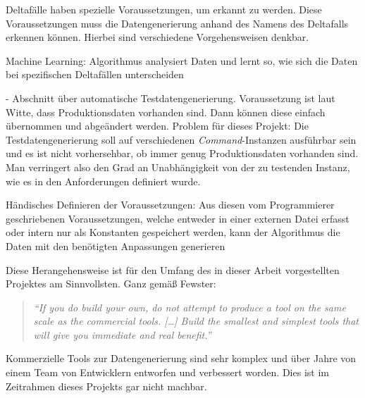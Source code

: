 Deltafälle haben spezielle Voraussetzungen, um erkannt zu werden. Diese Voraussetzungen muss die Datengenerierung anhand des Namens des Deltafalls erkennen können. Hierbei sind verschiedene Vorgehensweisen denkbar. 

Machine Learning: Algorithmus analysiert Daten und lernt so, wie sich die Daten bei spezifischen Deltafällen unterscheiden

\cite[S. 240]{witte:2019} - Abschnitt über automatische Testdatengenerierung. Voraussetzung ist laut Witte, dass Produktionsdaten vorhanden sind. Dann können diese einfach übernommen und abgeändert werden. Problem für dieses Projekt: Die Testdatengenerierung soll auf verschiedenen \textit{Command}-Instanzen ausführbar sein und es ist nicht vorhersehbar, ob immer genug Produktionsdaten vorhanden sind. Man verringert also den Grad an Unabhängigkeit von der zu testenden Instanz, wie es in den Anforderungen definiert wurde.

Händisches Definieren der Voraussetzungen: Aus diesen vom Programmierer geschriebenen Voraussetzungen, welche entweder in einer externen Datei erfasst oder intern nur als Konstanten gespeichert werden, kann der Algorithmus die Daten mit den benötigten Anpassungen generieren

Diese Herangehensweise ist für den Umfang des in dieser Arbeit vorgestellten Projektes am Sinnvollsten. Ganz gemäß Fewster:

\begin{quote}
    \textit{\enquote{If you do build your own, do not attempt to produce a tool on the same scale as the commercial tools. [\dots] Build the smallest and simplest tools that will give you immediate and real benefit.} \cite{fewster:1999}}
\end{quote}

Kommerzielle Tools zur Datengenerierung sind sehr komplex und über Jahre von einem Team von Entwicklern entworfen und verbessert worden. Dies ist im Zeitrahmen dieses Projekts gar nicht machbar.

